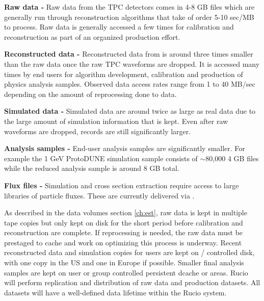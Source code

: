 \documentclass[../main-v1.tex]{subfiles}
\begin{document}
\begin{description}
    \item{\bf Raw data -}  Raw data from the TPC detectors comes in 4-8 GB files which are generally run through reconstruction algorithms that take of order 5-10 sec/MB to process. Raw data is generally accessed a few times for calibration and reconstruction as part of an organized production effort.  
    \item{\bf Reconstructed data -}  Reconstructed data from  is around three times smaller  than the raw data once the raw TPC waveforms are dropped. It is accessed many times by end users for algorithm development, calibration and production of physics analysis samples.   Observed data access rates range from 1 to 40 MB/sec depending on the amount of reprocessing done to data. 
    \item{\bf Simulated data - } Simulated data are around twice as large as real data due to the large amount of simulation information that is kept.  Even after raw waveforms are dropped, records are still significantly larger. 
    \item{\bf Analysis samples - } End-user analysis samples are significantly smaller.  For example the 1 GeV ProtoDUNE simulation sample consists of $\sim$80,000 4 GB files while the reduced analysis sample is around 8 GB total.  
    \item{\bf Flux files - } Simulation and cross section extraction require access to large libraries of particle fluxes.  These are currently delivered via . 
    
\end{description}

As described in the data volumes section \ref{ch:est}, raw data is kept in multiple tape copies but only kept on disk for the short period before calibration and reconstruction are complete.  If reprocessing is needed, the raw data must be prestaged to cache and work on optimizing this process is underway. Recent reconstructed data and simulation copies for users are kept on / controlled disk, with one copy in the US and one in Europe if possible. Smaller final analysis samples are kept on user or group controlled persistent dcache or  areas. Rucio will perform replication and distribution of raw data and production datasets. 
 All datasets will have a well-defined data lifetime within the Rucio system. 
\end{document}
